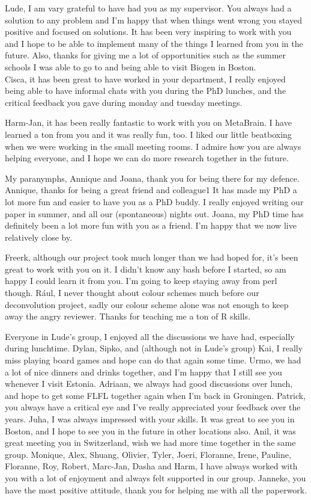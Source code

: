 \begin{appendices}
Lude, I am vary grateful to have had you as my supervisor. You always had a solution to any problem and I'm happy that when things went wrong you stayed positive and focused on solutions. It has been very inspiring to work with you and I hope to be able to implement many of the things I learned from you in the future. Also, thanks for giving me a lot of opportunities such as the summer schools I was able to go to and being able to visit Biogen in Boston.  \\
Cisca, it has been great to have worked in your department, I really enjoyed being able to have informal chats with you during the PhD lunches, and the critical feedback you gave during monday and tuesday meetings.

Harm-Jan, it has been really fantastic to work with you on MetaBrain. I have learned a ton from you and it was really fun, too. I liked our little beatboxing when we were working in the small meeting rooms. I admire how you are always helping everyone, and I hope we can do more research together in the future.

My paranymphs, Annique and Joana, thank you for being there for my defence. Annique, thanks for being a great friend and colleague1 It has made my PhD a lot more fun and easier to have you as a PhD buddy. I really enjoyed writing our paper in summer, and all our (spontaneous) nights out. Joana, my PhD time has definitely been a lot more fun with you as a friend. I'm happy that we now live relatively close by.

Freerk, although our project took much longer than we had hoped for, it's been great to work with you on it. I didn't know any bash before I started, so am happy I could learn it from you. I'm going to keep staying away from perl though. R\'aul, I never thought about colour schemes much before our deconvolution project, sadly our colour scheme alone was not enough to keep away the angry reviewer. Thanks for teaching me a ton of R skills. 

Everyone in Lude's group, I enjoyed all the discussions we have had, especially during lunchtime. Dylan, Sipko, and (although not in Lude's group) Kai, I really miss playing board games and hope can do that again some time. Urmo, we had a lot of nice dinners and drinks together, and I'm happy that I still see you whenever I visit Estonia. Adriaan, we always had good discussions over lunch, and hope to get some FLFL together again when I'm back in Groningen. Patrick, you always have a critical eye and I've really appreciated your feedback over the years. Juha, I was always impressed with your skills. It was great to see you in Boston, and I hope to see you in the future in other locations also. Anil, it was great meeting you in Switzerland, wish we had more time together in the same group. Monique, Alex, Shuang, Olivier, Tyler, Joeri, Floranne, Irene, Pauline, Floranne, Roy, Robert, Marc-Jan, Dasha and Harm, I have always worked with you with a lot of enjoyment and always felt supported in our group. Janneke, you have the most positive attitude, thank you for helping me with all the paperwork.



\end{appendices}
